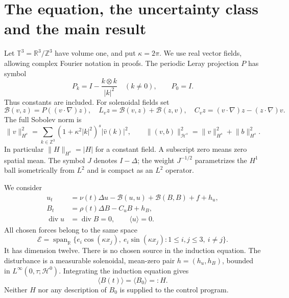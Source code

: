 \documentclass[11pt,a4paper]{amsart}
\theoremstyle{definition}
\theoremstyle{remark}
\numberwithin{equation}{section}
\newcommand{\T}{\mathbb T}
\newcommand{\R}{\mathbb R}
\newcommand{\Z}{\mathbb Z}
\newcommand{\Bcal}{\mathcal B}
\newcommand{\Hcal}{\mathcal H}
\newcommand{\Ecal}{\mathcal E}
\newcommand{\norm}[1]{\lVert #1\rVert}
\newcommand{\mean}[1]{\langle #1\rangle}
\newcommand{\diver}{\operatorname{div}}
\begin{document}
\section{The equation, the uncertainty class and the main result}\label{sec:setting}
Let $\T^3=\R^3/\Z^3$ have volume one, and put $\kappa=2\pi$. We use real vector fields, allowing complex Fourier notation in proofs. The periodic Leray projection $P$ has symbol
\[
 P_k=I-\frac{k\otimes k}{|k|^2}\quad(k\ne0),\qquad P_0=I.
\]
Thus constants are included. For solenoidal fields set
\[
 \Bcal(v,z)=P((v\cdot\nabla)z),\quad
 L_vz=\Bcal(v,z)+\Bcal(z,v),\quad
 C_vz=(v\cdot\nabla)z-(z\cdot\nabla)v.
\]
The full Sobolev norm is
\begin{equation}\label{eq:Hs}
 \norm v_{H^s}^2=\sum_{k\in\Z^3}(1+\kappa^2|k|^2)^s|\widehat v(k)|^2,
 \qquad
 \norm{(v,b)}_{\Hcal^s}^2=\norm v_{H^s}^2+\norm b_{H^s}^2.
\end{equation}
In particular $\norm H_{H^s}=|H|$ for a constant field. A subscript zero means zero spatial mean. The symbol $J$ denotes $I-\Delta$; the weight $J^{-1/2}$ parametrizes the $H^1$ ball isometrically from $L^2$ and is compact as an $L^2$ operator.

We consider
\begin{equation}\label{eq:mhd}
 \begin{aligned}
 u_t&=\nu(t)\Delta u-\Bcal(u,u)+\Bcal(B,B)+f+h_u,\\
 B_t&=\rho(t)\Delta B-C_uB+h_B,\\
 \diver u&=\diver B=0,\qquad \mean u=0.
 \end{aligned}
\end{equation}
All chosen forces belong to the same space
\begin{equation}\label{eq:twelve}
 \Ecal=\operatorname{span}_{\R}\{e_i\cos(\kappa x_j),\ e_i\sin(\kappa x_j):1\le i,j\le3,\ i\ne j\}.
\end{equation}
It has dimension twelve. There is no chosen source in the induction equation.
The disturbance is a measurable solenoidal, mean-zero pair $h=(h_u,h_B)$, bounded in $L^\infty(0,\tau;\Hcal^0)$. Integrating the induction equation gives
\begin{equation}\label{eq:mean}
 \mean{B(t)}=\mean{B_0}=:H.
\end{equation}
Neither $H$ nor any description of $B_0$ is supplied to the control program.
\end{document}
